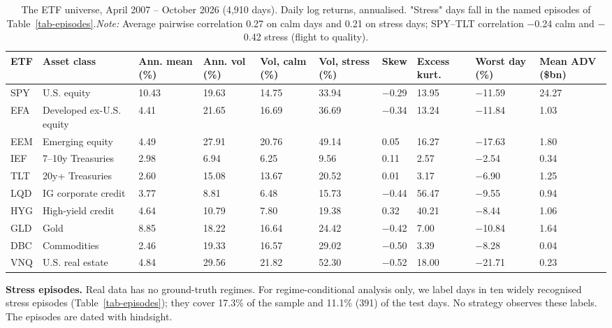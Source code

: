 \documentclass[11pt]{article}
\begin{document}
\begin{table}[!htbp]
\centering\scriptsize
\caption{The ETF universe, April 2007 -- October 2026 (4,910 days). Daily log returns, annualised. "Stress" days fall in the named episodes of Table~\ref{tab-episodes}.\label{tab-etf} \emph{Note:} Average pairwise correlation 0.27 on calm days and 0.21 on stress days; SPY--TLT correlation $-$0.24 calm and $-$0.42 stress (flight to quality).}
\begin{adjustbox}{max width=\linewidth}
\begin{tabular}{@{}llllllllll@{}}
\toprule
ETF & Asset class & Ann. mean (\%) & Ann. vol (\%) & Vol, calm (\%) & Vol, stress (\%) & Skew & Excess kurt. & Worst day (\%) & Mean ADV (\$bn) \\
\midrule
SPY & U.S. equity & 10.43 & 19.63 & 14.75 & 33.94 & $-$0.29 & 13.95 & $-$11.59 & 24.27 \\
EFA & Developed ex-U.S. equity & 4.41 & 21.65 & 16.69 & 36.69 & $-$0.34 & 13.24 & $-$11.84 & 1.03 \\
EEM & Emerging equity & 4.49 & 27.91 & 20.76 & 49.14 & 0.05 & 16.27 & $-$17.63 & 1.80 \\
IEF & 7--10y Treasuries & 2.98 & 6.94 & 6.25 & 9.56 & 0.11 & 2.57 & $-$2.54 & 0.34 \\
TLT & 20y+ Treasuries & 2.60 & 15.08 & 13.67 & 20.52 & 0.01 & 3.17 & $-$6.90 & 1.25 \\
LQD & IG corporate credit & 3.77 & 8.81 & 6.48 & 15.73 & $-$0.44 & 56.47 & $-$9.55 & 0.94 \\
HYG & High-yield credit & 4.64 & 10.79 & 7.80 & 19.38 & 0.32 & 40.21 & $-$8.44 & 1.06 \\
GLD & Gold & 8.85 & 18.22 & 16.64 & 24.42 & $-$0.42 & 7.00 & $-$10.84 & 1.64 \\
DBC & Commodities & 2.46 & 19.33 & 16.57 & 29.02 & $-$0.50 & 3.39 & $-$8.28 & 0.04 \\
VNQ & U.S. real estate & 4.84 & 29.56 & 21.82 & 52.30 & $-$0.52 & 18.00 & $-$21.71 & 0.23 \\
\bottomrule
\end{tabular}
\end{adjustbox}
\end{table}

\textbf{Stress episodes.} Real data has no ground-truth regimes. For regime-conditional analysis only, we label days in ten widely recognised stress episodes (Table~\ref{tab-episodes}); they cover 17.3\% of the sample and 11.1\% (391) of the test days. No strategy observes these labels. The episodes are dated with hindsight.
\end{document}
